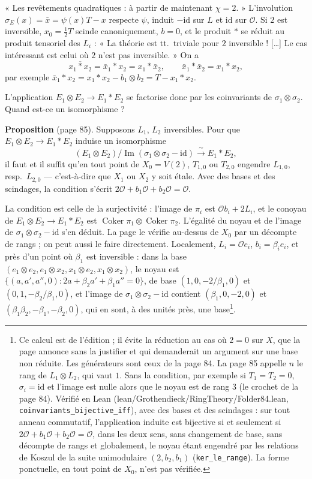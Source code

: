 \documentclass[11pt,a4paper]{article}
\begin{document}
« Les revêtements quadratiques : à partir de maintenant $\chi = 2$. » L'involution
$\sigma_E(x) = \bar{x} = \psi(x)T - x$ respecte $\psi$, induit $-\mathrm{id}$ sur $L$ et
$\mathrm{id}$ sur $\mathcal{O}$. Si $2$ est inversible, $x_0 = \tfrac{1}{2}T$ scinde
canoniquement, $b = 0$, et le produit $*$ se réduit au produit tensoriel des $L_i$ :
« La théorie est tt.\ triviale pour $2$ inversible ! […] Le cas intéressant est
celui où $2$ n'est pas inversible. » On a
\[
  \overline{x_1 * x_2} = \bar{x}_1 * x_2 = x_1 * \bar{x}_2, \qquad \bar{x}_1 * \bar{x}_2 = x_1 * x_2,
\]
par exemple $\bar{x}_1 * x_2 = x_1 * x_2 - b_1 \otimes b_2 = T - x_1 * x_2$.

L'application $E_1 \otimes E_2 \to E_1 * E_2$ se factorise donc par les coinvariants de
$\sigma_1 \otimes \sigma_2$. Quand est-ce un isomorphisme ?

\textbf{Proposition} (page 85). Supposons $L_1$, $L_2$ inversibles. Pour que $E_1 \otimes E_2
\to E_1 * E_2$ induise un isomorphisme
\[
  (E_1 \otimes E_2)/\operatorname{Im}(\sigma_1 \otimes \sigma_2 - \mathrm{id}) \xrightarrow{\ \sim\ } E_1 * E_2,
\]
il faut et il suffit qu'en tout point de $X_0 = V(2)$, $T_{1,0}$ ou $T_{2,0}$ engendre
$L_{1,0}$, resp.\ $L_{2,0}$ --- c'est-à-dire que $X_1$ ou $X_2$ y soit étale. Avec
des bases et des scindages, la condition s'écrit $2\mathcal{O} + b_1\mathcal{O} +
b_2\mathcal{O} = \mathcal{O}$.

La condition est celle de la surjectivité : l'image de $\pi_i$ est
$\mathcal{O}b_i + 2L_i$, et le conoyau de $E_1 \otimes E_2 \to E_1 * E_2$ est
$\operatorname{Coker}\pi_1 \otimes \operatorname{Coker}\pi_2$. L'égalité du noyau et de
l'image de $\sigma_1 \otimes \sigma_2 - \mathrm{id}$ s'en déduit. La page le vérifie au-dessus
de $X_0$ par un décompte de rangs ; on peut aussi le faire directement.
Localement, $L_i = \mathcal{O}e_i$, $b_i = \beta_i e_i$, et près d'un point où $\beta_1$ est
inversible : dans la base $(e_1 \otimes e_2, e_1 \otimes x_2, x_1 \otimes e_2, x_1 \otimes x_2)$,
le noyau est $\{(a, a', a'', 0) : 2a + \beta_2a' + \beta_1a'' = 0\}$, de base
$(1, 0, -2/\beta_1, 0)$ et $(0, 1, -\beta_2/\beta_1, 0)$, et l'image de $\sigma_1 \otimes
\sigma_2 - \mathrm{id}$ contient $(\beta_1, 0, -2, 0)$ et
$(\beta_1\beta_2, -\beta_1, -\beta_2, 0)$, qui en sont, à des unités près, une
base\footnote{Ce calcul est de l'édition ; il évite la réduction au cas où
$2 = 0$ sur $X$, que la page annonce sans la justifier et qui demanderait un
argument sur une base non réduite. Les générateurs sont ceux de la page 84. La
page 85 appelle $n$ le rang de $L_1 \otimes L_2$, qui vaut $1$. Sans la condition,
par exemple si $T_1 = T_2 = 0$, $\sigma_i = \mathrm{id}$ et l'image est nulle alors que
le noyau est de rang $3$ (le crochet de la page 84). Vérifié en Lean
(lean/Grothendieck/RingTheory/Folder84.lean, \texttt{coinvariants\_bijective\_iff}), avec
des bases et des scindages : sur tout anneau commutatif, l'application induite est
bijective si et seulement si $2\mathcal{O} + b_1\mathcal{O} + b_2\mathcal{O} =
\mathcal{O}$, dans les deux sens, sans changement de base, sans décompte de rangs
et globalement, le noyau étant engendré par les relations de Koszul de la suite
unimodulaire $(2, b_2, b_1)$ (\texttt{ker\_le\_range}). La forme ponctuelle, en
tout point de $X_0$, n'est pas vérifiée.}.
\end{document}
